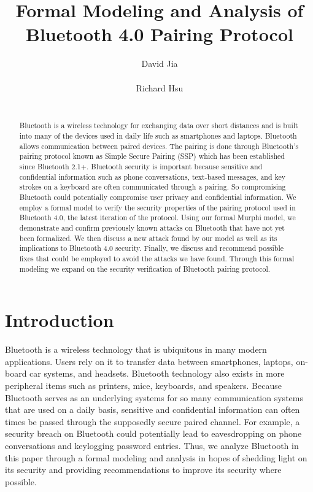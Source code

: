 \documentclass{acm_proc_article-sp}
\begin{document}
\title{Formal Modeling and Analysis of \\ Bluetooth 4.0 Pairing Protocol}
\author{
    \alignauthor David Jia \\
		 \\
	\alignauthor Richard Hsu \\
	     \\
}

\maketitle

\begin{abstract}
Bluetooth is a wireless technology for exchanging data over short distances and is built into many of the devices used in daily life such as smartphones and laptops. Bluetooth allows communication between paired devices. The pairing is done through Bluetooth's pairing protocol known as Simple Secure Pairing (SSP) which has been established since Bluetooth 2.1+. Bluetooth security is important because sensitive and confidential information such as phone conversations, text-based messages, and key strokes on a keyboard are often communicated through a pairing. So compromising Bluetooth could potentially compromise user privacy and confidential information. We employ a formal model to verify the security properties of the pairing protocol used in Bluetooth 4.0, the latest iteration of the protocol. Using our formal Murphi model, we demonstrate and confirm previously known attacks on Bluetooth that have not yet been formalized. We then discuss a new attack found by our model as well as its implications to Bluetooth 4.0 security. Finally, we discuss and recommend possible fixes that could be employed to avoid the attacks we have found. Through this formal modeling we expand on the security verification of Bluetooth pairing protocol.
\end{abstract}


\section{Introduction}

Bluetooth is a wireless technology that is ubiquitous in many modern applications. Users rely on it to transfer data between smartphones, laptops, on-board car systems, and headsets. Bluetooth technology also exists in more peripheral items such as printers, mice, keyboards, and speakers. Because Bluetooth serves as an underlying systems for so many communication systems that are used on a daily basis, sensitive and confidential information can often times be passed through the supposedly secure paired channel. For example, a security breach on Bluetooth could potentially lead to eavesdropping on phone conversations and keylogging password entries. Thus, we analyze Bluetooth in this paper through a formal modeling and analysis in hopes of shedding light on its security and providing recommendations to improve its security where possible.
\end{document}

